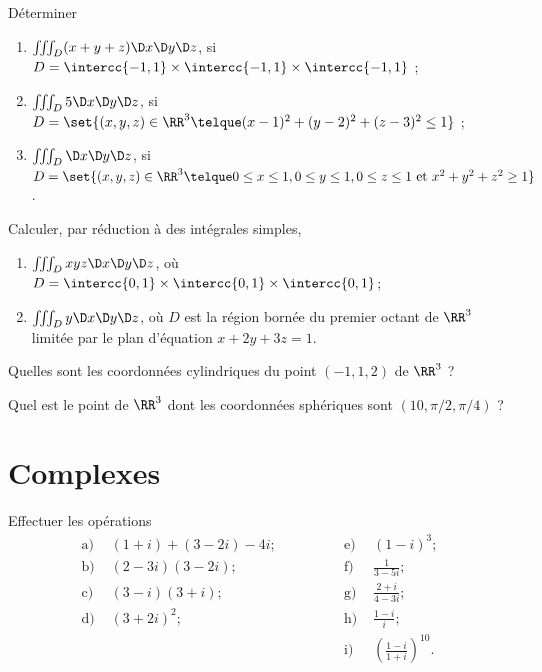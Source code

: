 \documentclass[12pt,french,oneside,a4paper]{memoir} %
\begin{document}
\begin{exo}
Déterminer
\begin{enumerate}
\item $\iiint_{D} (x+y+z) \D x \D y\D z$, si $D = \intercc{-1,1}\times\intercc{-1,1} \times\intercc{-1,1}$ ;
\item $\iiint_{D} 5 \D x \D y\D z$, si $D = \set{(x,y,z) \in \RR^{3} \telque (x-1)^{2} + (y-2)^{2} + (z-3)^{2} \leq 1}$ ;
\item $\iiint_{D}  \D x \D y \D z$, si $D = \set{(x,y,z) \in \RR^3 \telque 0 \leq x \leq 1, 0 \leq y \leq 1, 0 \leq z \leq 1 \text{ et } x^{2}+y^{2}+z^{2} \geq 1}$.
\end{enumerate}
\end{exo}
\begin{exo}
Calculer, par réduction à des intégrales simples,
\begin{enumerate}
\item $\iiint_{D} xyz  \D x \D y \D z$, où $D = \intercc{0,1}\times\intercc{0,1}\times\intercc{0,1}$;
\item $\iiint_{D}  y \D x \D y \D z$, où $D$ est la région bornée du premier octant de $\RR^3$ limitée par le plan d'équation $x + 2y + 3z = 1$.
\end{enumerate}
\end{exo}
\begin{exo}
Quelles sont les coordonnées cylindriques du point $(-1,1,2)$ de $\RR^3$ ?
\end{exo}
\begin{exo}
Quel est le point de $\RR^3$ dont les coordonnées sphériques sont $(10, \pi/2, \pi/4)$ ?
\end{exo}
\chapter{Complexes}

\begin{exo}
Effectuer les opérations
\begin{equation*}
\begin{array}{llll}
\mbox{a) } &(1+i)+(3-2i)-4i; \qquad \qquad &\mbox{e) } &(1-i)^3; \\[2mm]
\mbox{b) } &(2-3i)(3-2i);    &\mbox{f) } &\displaystyle{\frac{1}{3-5i}}; \\[2mm]
\mbox{c) } &(3-i)(3+i); &\mbox{g) } &\displaystyle{\frac{2+i}{4-3i}}; \\[2mm]
\mbox{d) } &(3+2i)^2; &\mbox{h) } &\displaystyle{\frac{1-i}{i}}; \\[2mm]
&&\mbox{i) } &\left(\displaystyle{\frac{1-i}{1+i}}\right)^{10}.
\end{array}
\end{equation*}
\end{exo}
\end{document}
